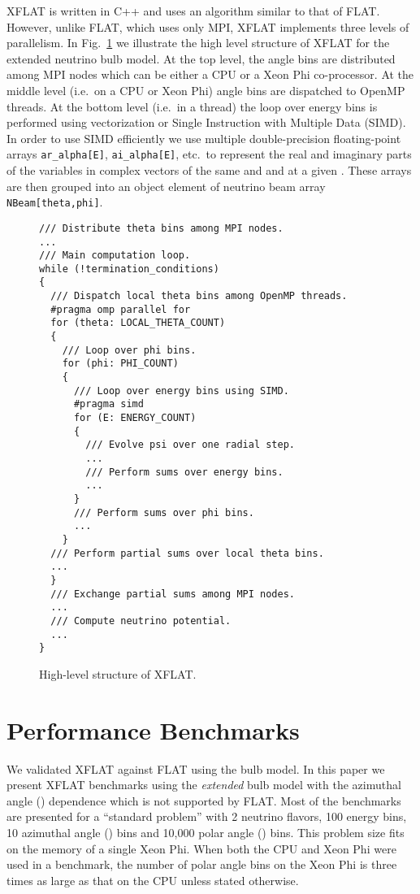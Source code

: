 \documentclass{sig-alternate}
\begin{document}
XFLAT is written in C++ and uses an algorithm similar to that of FLAT.
However, unlike FLAT, which uses only MPI, XFLAT implements three levels of
parallelism. In Fig.~\ref{fig:xflat} we illustrate the high level
structure of XFLAT for the extended neutrino bulb model. 
At the top level, the  angle bins are distributed among MPI 
nodes which can be either a CPU or a Xeon Phi co-processor. At the
middle level (i.e.\ on a CPU or Xeon Phi)  angle bins are
dispatched to OpenMP threads. At the 
bottom level (i.e.\ in a thread) the loop over energy bins is
performed using vectorization or Single Instruction with Multiple
Data (SIMD). In order to use SIMD efficiently we use multiple
double-precision floating-point arrays
\texttt{ar\_alpha[E]}, \texttt{ai\_alpha[E]}, etc.\ to represent the real
and imaginary parts of the variables in complex vectors
 of the same 
and  and at a given . These arrays are then grouped into
an object element of neutrino beam array \texttt{NBeam[theta,phi]}.

\begin{figure}
\begin{verbatim}
/// Distribute theta bins among MPI nodes.
...
/// Main computation loop.
while (!termination_conditions)
{
  /// Dispatch local theta bins among OpenMP threads.
  #pragma omp parallel for
  for (theta: LOCAL_THETA_COUNT)
  {
    /// Loop over phi bins.
    for (phi: PHI_COUNT)
    {
      /// Loop over energy bins using SIMD.
      #pragma simd
      for (E: ENERGY_COUNT)
      {
        /// Evolve psi over one radial step.
        ...
        /// Perform sums over energy bins.
        ...
      }
      /// Perform sums over phi bins.
      ...
    }
  /// Perform partial sums over local theta bins.
  ...
  }
  /// Exchange partial sums among MPI nodes.
  ...
  /// Compute neutrino potential.
  ...
}
\end{verbatim}
\caption{High-level structure of XFLAT.}
\label{fig:xflat}
\end{figure}



\section{Performance Benchmarks}
We validated XFLAT against FLAT using the bulb model. In this paper we present
XFLAT benchmarks using the \emph{extended} bulb
model with the azimuthal angle () dependence which is not
supported by FLAT. Most of the benchmarks are presented for a
``standard problem'' with 2
neutrino flavors, 100 energy bins, 10 azimuthal angle ()
bins and 10,000 polar angle () bins. This problem size fits on the
memory of a single Xeon Phi.
When both the CPU and Xeon Phi were used in a benchmark, the number of
polar angle bins on the Xeon Phi 
is three times as large as that on the CPU unless stated otherwise.
\end{document}

